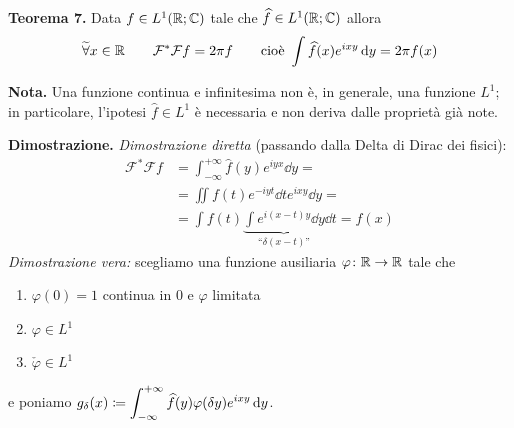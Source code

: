 \textbf{Teorema 7.}
Data $f \in L^1(\mathbb R; \mathbb C)$ tale che $\widehat f \in L^1(\mathbb R; \mathbb C)$ allora
$$
	\widetilde\forall x \in \mathbb R
	\qquad
	\mathcal F^* \mathcal F f = 2 \pi f
	\qquad
	\text{cioè }
	\int \widehat f(x) e^{ixy} \,\mathrm{d} y = 2\pi f(x)
$$

\textbf{Nota.} Una funzione continua e infinitesima non è, in generale, una funzione $L^1$; in particolare, l'ipotesi $\hat{f} \in L^1$ è necessaria e non deriva dalle proprietà già note.

\textbf{Dimostrazione.}
\textit{Dimostrazione diretta} (passando dalla Delta di Dirac dei fisici):
$$
\begin{aligned}
	\mathcal F^* \mathcal F f 
	&= \int_{-\infty}^{+\infty} \hat f(y) e^{iyx} \dd y = \\
	&= \iint f(t) e^{-iyt} \dd t e^{ixy} \dd y = \\
	&= \int f(t) \underbrace{\int e^{i(x-t)y} \dd y}_{\text{``$\delta(x-t)$''}} \dd t = f(x)
\end{aligned}
$$
\textit{Dimostrazione vera:} scegliamo una funzione ausiliaria $\varphi \colon \mathbb R \to \mathbb R$ tale che
\begin{enumerate}
	\item $\varphi(0) = 1$ continua in $0$ e $\varphi$ limitata
	\item $\varphi \in L^1$
	\item $\check\varphi \in L^1$
\end{enumerate}
e poniamo $g_\delta(x) \coloneqq \displaystyle \int_{-\infty}^{+\infty} \widehat f(y) \varphi(\delta y) e^{ixy} \,\mathrm{d} y$.
